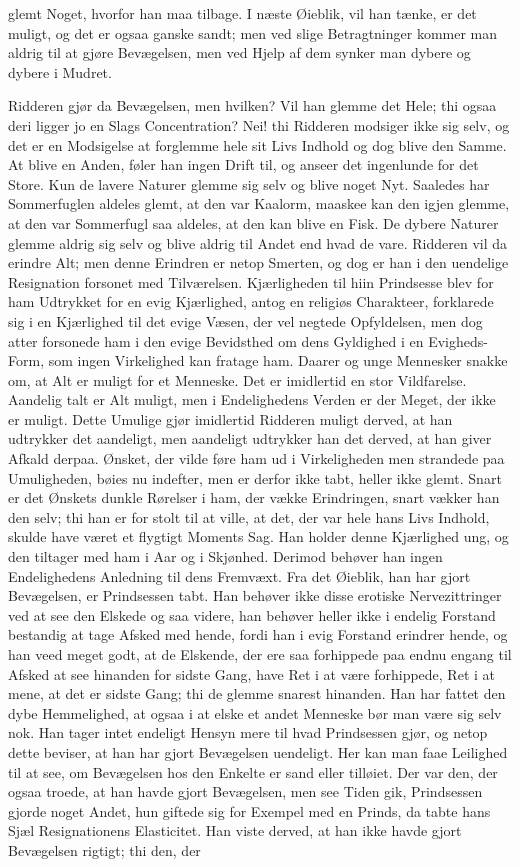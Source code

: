 \documentclass[12pt,a4paper]{article}
\begin{document}
glemt Noget, hvorfor han maa tilbage. I næste Øieblik, vil han tænke, er det muligt, og det er ogsaa ganske sandt; men ved slige Betragtninger kommer man aldrig til at gjøre Bevægelsen, men ved Hjelp af dem synker man dybere og dybere i Mudret.

Ridderen gjør da Bevægelsen, men hvilken? Vil han glemme det Hele; thi ogsaa deri ligger jo en Slags Concentration? Nei! thi Ridderen modsiger ikke sig selv, og det er en Modsigelse at forglemme hele sit Livs Indhold og dog blive den Samme. At blive en Anden, føler han ingen Drift til, og anseer det ingenlunde for det Store. Kun de lavere Naturer glemme sig selv og blive noget Nyt. Saaledes har Sommerfuglen aldeles glemt, at den var Kaalorm, maaskee kan den igjen glemme, at den var Sommerfugl saa aldeles, at den kan blive en Fisk. De dybere Naturer glemme aldrig sig selv og blive aldrig til Andet end hvad de vare. Ridderen vil da erindre Alt; men denne Erindren er netop Smerten, og dog er han i den uendelige Resignation forsonet med Tilværelsen. Kjærligheden til hiin Prindsesse blev for ham Udtrykket for en evig Kjærlighed, antog en religiøs Charakteer, forklarede sig i en Kjærlighed til det evige Væsen, der vel negtede Opfyldelsen, men dog atter forsonede ham i den evige Bevidsthed om dens Gyldighed i en Evigheds-Form, som ingen Virkelighed kan fratage ham. Daarer og unge Mennesker snakke om, at Alt er muligt for et Menneske. Det er imidlertid en stor Vildfarelse. Aandelig talt er Alt muligt, men i Endelighedens Verden er der Meget, der ikke er muligt. Dette Umulige gjør imidlertid Ridderen muligt derved, at han udtrykker det aandeligt, men aandeligt udtrykker han det derved, at han giver Afkald derpaa. Ønsket, der vilde føre ham ud i Virkeligheden men strandede paa Umuligheden, bøies nu indefter, men er derfor ikke tabt, heller ikke glemt. Snart er det Ønskets dunkle Rørelser i ham, der vække Erindringen, snart vækker han den selv; thi han er for stolt til at ville, at det, der var hele hans Livs Indhold, skulde have været et flygtigt Moments Sag. Han holder denne Kjærlighed ung, og den tiltager med ham i Aar og i Skjønhed. Derimod behøver han ingen Endelighedens Anledning til dens Fremvæxt. Fra det Øieblik, han har gjort Bevægelsen, er Prindsessen tabt. Han behøver ikke disse erotiske Nervezittringer ved at see den Elskede og saa videre, han behøver heller ikke i endelig Forstand bestandig at tage Afsked med hende, fordi han i evig Forstand erindrer hende, og han veed meget godt, at de Elskende, der ere saa forhippede paa endnu engang til Afsked at see hinanden for sidste Gang, have Ret i at være forhippede, Ret i at mene, at det er sidste Gang; thi de glemme snarest hinanden. Han har fattet den dybe Hemmelighed, at ogsaa i at elske et andet Menneske bør man være sig selv nok. Han tager intet endeligt Hensyn mere til hvad Prindsessen gjør, og netop dette beviser, at han har gjort Bevægelsen uendeligt. Her kan man faae Leilighed til at see, om Bevægelsen hos den Enkelte er sand eller tilløiet. Der var den, der ogsaa troede, at han havde gjort Bevægelsen, men see Tiden gik, Prindsessen gjorde noget Andet, hun giftede sig for Exempel med en Prinds, da tabte hans Sjæl Resignationens Elasticitet. Han viste derved, at han ikke havde gjort Bevægelsen rigtigt; thi den, der 
\end{document}
